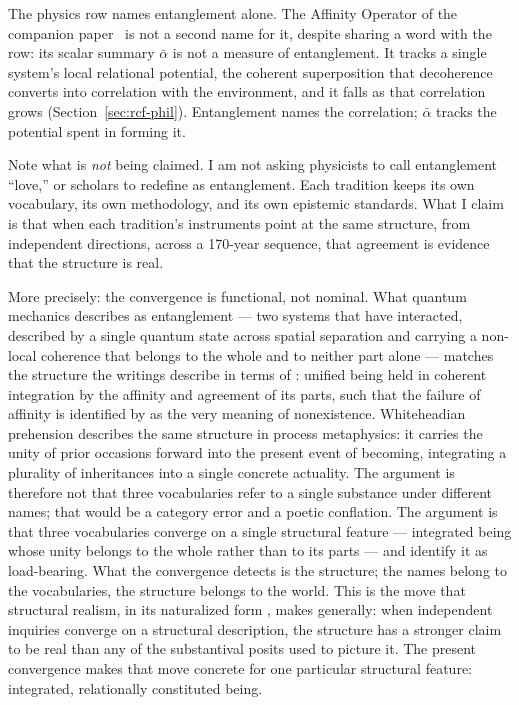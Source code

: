 The physics row names entanglement alone.
The Affinity Operator of the companion paper~\citep{Adams2026Physics} is
not a second name for it, despite sharing a word with the \bahai row:
its scalar summary $\bar\alpha$ is not a measure of entanglement.
It tracks a single system's local relational potential, the coherent
superposition that decoherence converts into correlation with the
environment, and it falls as that correlation grows
(Section~\ref{sec:rcf-phil}).
Entanglement names the correlation; $\bar\alpha$ tracks the potential spent
in forming it.

Note what is \emph{not} being claimed.
I am not asking physicists to call entanglement ``love,'' or \bahai scholars
to redefine \mahabbat as entanglement.
Each tradition keeps its own vocabulary, its own methodology, and its own
epistemic standards.
What I claim is that when each tradition's instruments point at the same
structure, from independent directions, across a 170-year sequence,
that agreement is evidence that the structure is real.

More precisely: the convergence is functional, not nominal.
What quantum mechanics describes as entanglement --- two systems that
have interacted, described by a single quantum state across spatial
separation and carrying a non-local coherence that belongs to the whole
and to neither part alone --- matches the structure the \bahai writings describe in terms
of \mahabbat: unified being held in coherent integration by the affinity
and agreement of its parts, such that the failure of affinity is
identified by \AbdulBaha as the very meaning of nonexistence.
Whiteheadian prehension describes the same structure in process
metaphysics: it carries the unity of prior occasions forward into the
present event of becoming, integrating a plurality of inheritances into a
single concrete actuality.
The argument is therefore not that three vocabularies refer to a single
substance under different names; that would be a category error and a
poetic conflation.
The argument is that three vocabularies converge on a single structural
feature --- integrated being whose unity belongs to the whole rather than
to its parts --- and identify it as load-bearing.
What the convergence detects is the structure; the names belong to the
vocabularies, the structure belongs to the world.
This is the move that structural realism, in its naturalized form
\citep{LadymanRoss2007}, makes generally: when independent inquiries
converge on a structural description, the structure has a stronger
claim to be real than any of the substantival posits used to picture it.
The present convergence makes that move concrete for one particular
structural feature: integrated, relationally constituted being.

